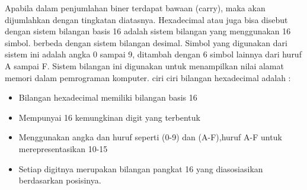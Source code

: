 	Apabila dalam penjumlahan biner terdapat bawaan (carry), maka akan dijumlahkan dengan tingkatan diatasnya.
	Hexadecimal atau juga bisa disebut dengan sistem bilangan basis 16 adalah sistem bilangan yang menggunakan 16 simbol. berbeda dengan sistem bilangan desimal. Simbol yang digunakan dari sistem ini adalah angka 0 sampai 9, ditambah dengan 6 simbol lainnya dari huruf A sampai F. Sistem bilangan ini digunakan untuk menampilkan nilai alamat memori dalam pemrograman komputer\cite{nurhayati2010aritmatik}.
	ciri ciri bilangan hexadecimal adalah :

	\begin{itemize}
		\item Bilangan hexadecimal memiliki bilangan basis 16
		\item Mempunyai 16 kemungkinan digit yang terbentuk
		\item Menggunakan angka dan huruf seperti (0-9) dan (A-F),huruf A-F untuk merepresentasikan 10-15
		\item Setiap digitnya merupakan bilangan pangkat 16 yang diasosiasikan berdasarkan posisinya.
	\end{itemize}

